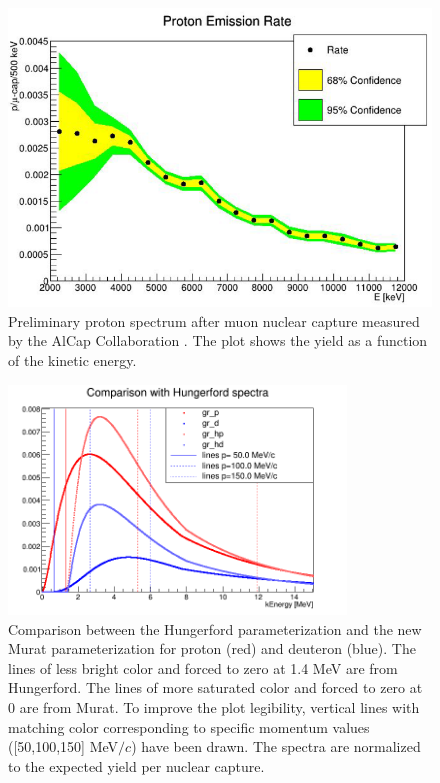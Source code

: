 \documentclass[12pt,a4paper,openright, oneside, titlepage]{book} %
\begin{document}
\begin{figure}[h!]
\centering
\includegraphics[scale=0.6]{new_spectra_2/Quirk_protons}
\caption[AlCap measured spectra]{Preliminary proton spectrum after muon nuclear capture measured by the AlCap Collaboration \cite{AlCap:2020}. 
The plot shows the yield as a function of the kinetic energy.}
\label{_AlCap}
\end{figure}

\begin{figure}[!htb]
\centering
\includegraphics[width =0.8\textwidth, keepaspectratio]{new_spectra_2/comparison2}
\caption[Comparison of spectrum parameteerizations]{Comparison \cite{io:comparison} between the Hungerford parameterization \cite{Hungerford} 
and the new Murat parameterization \cite{Pasha:spectra} for proton (red) and deuteron (blue). 
The lines of less bright color and forced to zero at 1.4 MeV are from Hungerford.
 The lines of more saturated color and forced to zero at 0 are from Murat.
To improve the plot legibility, 
vertical lines with matching color corresponding to specific momentum values ([50,100,150] MeV$/c$) have been drawn. The spectra are normalized to the expected yield per nuclear capture.}
\label{_comparison2}
\end{figure}
\end{document}

